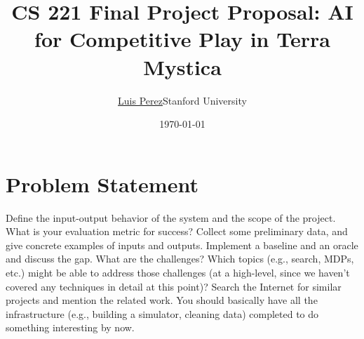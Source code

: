 \documentclass[10pt]{article}
\title{CS 221 Final Project Proposal: AI for Competitive Play in Terra Mystica}
\author{\href{mailto:luisperez@cs.stanford.edu}{Luis Perez}{Stanford University}}
\date{\today}
\begin{document}
 \begin{center}
  \end{center}

\section{Problem Statement}
Define the input-output behavior of the system and the scope of the project. What is your evaluation metric for success? Collect some preliminary data, and give concrete examples of inputs and outputs. Implement a baseline and an oracle and discuss the gap. What are the challenges? Which topics (e.g., search, MDPs, etc.) might be able to address those challenges (at a high-level, since we haven't covered any techniques in detail at this point)? Search the Internet for similar projects and mention the related work. You should basically have all the infrastructure (e.g., building a simulator, cleaning data) completed to do something interesting by now.
\end{document}
